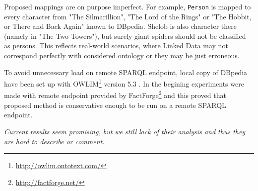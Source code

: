 \documentclass{llncs}
\begin{document}
Proposed mappings are on purpose imperfect. For example, \texttt{Person} is
mapped to every character from "The Silmarillion", "The Lord of the Rings" or
"The Hobbit, or There and Back Again" known to DBpedia. Shelob is also
character there (namely in "The Two Towers"), but surely giant spiders should
not be classified as persons. This reflects real-world scenarios, where Linked
Data may not correspond perfectly with considered ontology or they may be just
erroneous.

To avoid unnecessary load on remote SPARQL endpoint, local copy of DBpedia have
been set up with OWLIM\footnote{\url{http://owlim.ontotext.com/}} version 5.3
\cite{owlim}. In the begining experiments were made with remote endpoint
provided by FactForge\footnote{\url{http://factforge.net/}} \cite{factforge} and this
proved that proposed method is conservative enough to be run on a remote SPARQL
endpoint.

\emph{Current results seem promising, but we still lack of their analysis and thus they are hard to describe or comment.}
\end{document}
